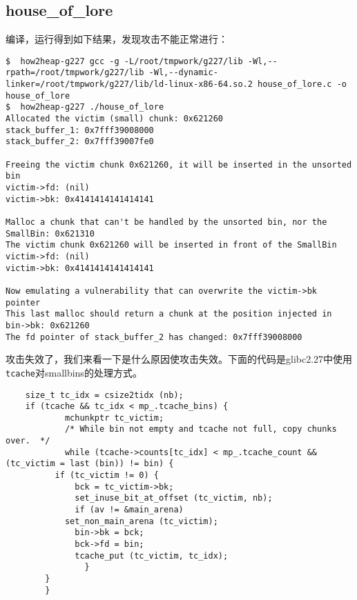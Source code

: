 \subsection{house\_of\_lore}
编译，运行得到如下结果，发现攻击不能正常进行：
\begin{verbatim}
$  how2heap-g227 gcc -g -L/root/tmpwork/g227/lib -Wl,--rpath=/root/tmpwork/g227/lib -Wl,--dynamic-linker=/root/tmpwork/g227/lib/ld-linux-x86-64.so.2 house_of_lore.c -o house_of_lore
$  how2heap-g227 ./house_of_lore
Allocated the victim (small) chunk: 0x621260
stack_buffer_1: 0x7fff39008000
stack_buffer_2: 0x7fff39007fe0

Freeing the victim chunk 0x621260, it will be inserted in the unsorted bin
victim->fd: (nil)
victim->bk: 0x4141414141414141

Malloc a chunk that can't be handled by the unsorted bin, nor the SmallBin: 0x621310
The victim chunk 0x621260 will be inserted in front of the SmallBin
victim->fd: (nil)
victim->bk: 0x4141414141414141

Now emulating a vulnerability that can overwrite the victim->bk pointer
This last malloc should return a chunk at the position injected in bin->bk: 0x621260
The fd pointer of stack_buffer_2 has changed: 0x7fff39008000
\end{verbatim}

攻击失效了，我们来看一下是什么原因使攻击失效。下面的代码是glibc2.27中使用\verb+ tcache+对smallbins的处理方式。

\begin{verbatim}
    size_t tc_idx = csize2tidx (nb);
    if (tcache && tc_idx < mp_.tcache_bins) {
            mchunkptr tc_victim;
            /* While bin not empty and tcache not full, copy chunks over.  */
            while (tcache->counts[tc_idx] < mp_.tcache_count && (tc_victim = last (bin)) != bin) {
          if (tc_victim != 0) {
              bck = tc_victim->bk;
              set_inuse_bit_at_offset (tc_victim, nb);
              if (av != &main_arena)
            set_non_main_arena (tc_victim);
              bin->bk = bck;
              bck->fd = bin;
              tcache_put (tc_victim, tc_idx);
                }
        }
        }
\end{verbatim}

